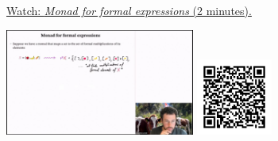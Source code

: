 
\begin{minipage}{10cm}
    \href{https://act4e-spring21.netlify.app/videos/spring2021-monads-b:monad-formal-expr.html}{Watch: \emph{Monad for formal expressions} (2 minutes).}
        
    \href{https://act4e-spring21.netlify.app/videos/spring2021-monads-b:monad-formal-expr.html}{\includegraphics[height=3.5cm]{spring2021-monads-b:monad-formal-expr/thumbnails.jpg}}
    \href{https://act4e-spring21.netlify.app/videos/spring2021-monads-b:monad-formal-expr.html}{\includegraphics[height=2.5cm]{spring2021-monads-b:monad-formal-expr/qrcode.png}}
\end{minipage}
